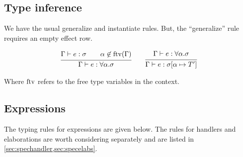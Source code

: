 \subsection{Type inference}

We have the usual generalize and instantiate rules. But, the ``generalize'' rule requires an empty effect row.

\begin{gather*}
    \infer{
        \Gamma \vdash e : \forall \alpha. \sigma
    }{
        \Gamma \vdash e : \sigma
        \qquad
        \alpha \not\in \ftv(\Gamma)
    }
    \qquad
    \infer{
        \Gamma \vdash e : \sigma[\alpha \mapsto T']
    }{
        \Gamma \vdash e : \forall \alpha. \sigma
    }
\end{gather*}

Where $\operatorname*{ftv}$ refers to the free type variables in the context.

\subsection{Expressions}
The typing rules for expressions are given below. The rules for handlers and elaborations are worth considering separately and are listed in \cref{sec:spechandler,sec:specelabs}.

